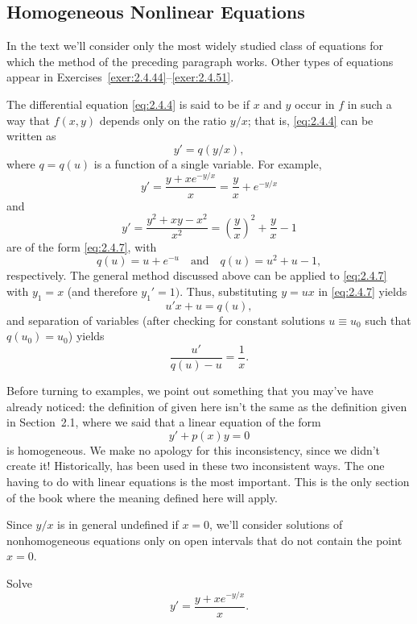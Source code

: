 \documentclass{ximera}
\begin{document}
\subsection*{Homogeneous Nonlinear Equations}

In the text  we'll consider only the most widely studied class of
equations for which the method of the preceding paragraph works.
Other types of equations appear in
Exercises~\ref{exer:2.4.44}--\ref{exer:2.4.51}.

The differential equation \eqref{eq:2.4.4}
is said to be  if  $x$ and $y$
occur in $f$ in such a way that  $f(x,y)$ depends only
on the ratio $y/x$; that is, \eqref{eq:2.4.4} can be written as
\begin{equation} \label{eq:2.4.7}
y'=q(y/x),
\end{equation}
where $q=q(u)$ is a function of a single variable.
For example,
$$
y'=\frac{y+xe^{-y/x}}{x}=\frac{y}{x}+e^{-y/x}
$$
and
$$
y'=\frac{y^2+xy-x^2}{x^2}=\left(\frac{y}{x}\right)^2+\frac{y}{x}
-1
$$
are of the form  \eqref{eq:2.4.7}, with
$$
q(u)=u+e^{-u}\quad\text{and}\quad q(u)=u^2+u-1,
$$
respectively. The general method discussed above can be
applied to
\eqref{eq:2.4.7} with $y_1=x$ (and therefore $y_1'=1)$. Thus,
substituting $y=ux$ in \eqref{eq:2.4.7} yields
$$
u'x+u=q(u),
$$
and separation of variables (after checking for constant
solutions $u\equiv u_0$ such that $q(u_0)=u_0$) yields
$$
\frac{u'}{q(u)-u}=\frac{1}{x}.
$$

Before turning to examples, we point out something that you may've have
already noticed:
 the definition of  given
here isn't  the same as the definition given in {\color{red} Section~2.1},
where we said that a linear equation of the form
$$
y'+p(x)y=0
$$
is homogeneous. We make no apology for this inconsistency, since we
didn't create it!  Historically,  has been
used in these two inconsistent ways. The one
having to do with linear equations is the most important. This
is the only section of the book where the meaning defined here will
apply.

Since $y/x$ is in general undefined if $x=0$, we'll consider
solutions of nonhomogeneous equations only on open intervals that do
not contain the point $x=0$.

\begin{example}\label{example:2.4.2}
Solve
\begin{equation} \label{eq:2.4.8}
y'=\frac{y+xe^{-y/x}}{x}.
\end{equation}
\end{example}
\end{document}
